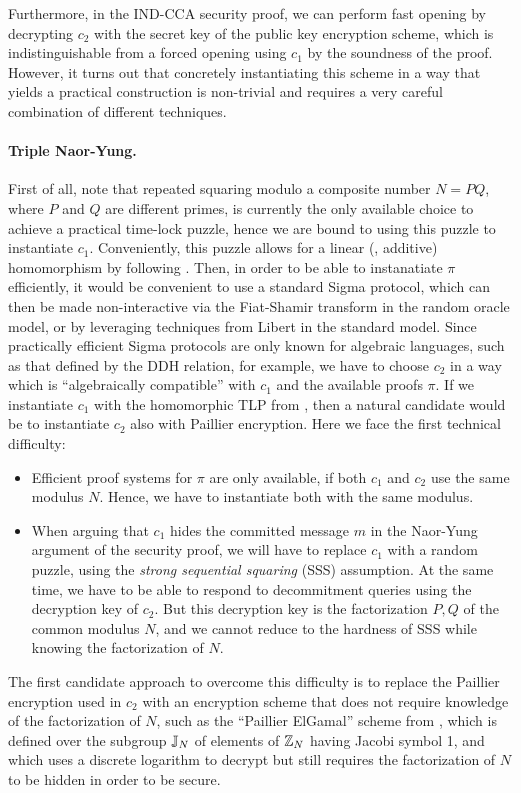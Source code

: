 Furthermore, in the IND-CCA security proof, we can perform fast opening by decrypting $c_2$ with the secret key of the public key encryption scheme, which is indistinguishable from a forced opening using $c_1$ by the soundness of the proof. 
%
However, it turns out that concretely instantiating this scheme in a way that yields a practical construction is non-trivial and requires a very careful combination of different techniques.

\paragraph{Triple Naor-Yung.}
First of all, note that repeated squaring modulo a composite number $N = PQ$, where $P$ and $Q$ are different primes, is currently the only available choice to achieve a practical time-lock puzzle, hence we are bound to using this puzzle to instantiate $c_1$. Conveniently, this puzzle allows for a linear (\ie, additive) homomorphism by following \cite{C:MalThy19}.
%
Then, in order to be able to instanatiate $\pi$ efficiently, it would be convenient to use a standard Sigma protocol, which can then be made non-interactive via the Fiat-Shamir transform \cite{C:FiaSha86} in the random oracle model, or by leveraging techniques from Libert \etal \cite{Libert2021OneShotFN} in the standard model. Since practically efficient Sigma protocols are only known for algebraic languages, such as that defined by the DDH relation, for example, we have to choose $c_2$ in a way which is ``algebraically compatible'' with $c_1$ and the available proofs $\pi$. If we instantiate $c_1$ with the homomorphic TLP from \cite{C:MalThy19}, then a natural candidate would be to instantiate $c_2$ also with Paillier encryption.  Here we face the first technical difficulty: 
\begin{itemize}
	\item Efficient proof systems for $\pi$ are only available, if both $c_1$ and $c_2$ use the same modulus $N$. Hence, we have to instantiate both with the same modulus.
	\item When arguing that $c_1$ hides the committed message $m$ in the Naor-Yung argument of the security proof, we will have to replace $c_1$ with a random puzzle, using the \emph{strong sequential squaring} (SSS) assumption. At the same time, we have to be able to respond to decommitment queries using the decryption key of $c_2$. But this decryption key is the factorization $P, Q$ of the common modulus $N$, and we cannot reduce to the hardness of SSS while knowing the factorization of $N$.
\end{itemize}
The first candidate approach to overcome this difficulty is to replace the Paillier encryption used in $c_2$ with an encryption scheme that does not require knowledge of the factorization of $N$, such as the ``Paillier ElGamal'' scheme from \cite{C:MalThy19}, which is defined over the subgroup $\mathbb{J}_N$ of elements of $\mathbb{Z}_N$ having Jacobi symbol 1, and which uses a discrete logarithm to decrypt but still requires the factorization of $N$ to be hidden in order to be secure.

